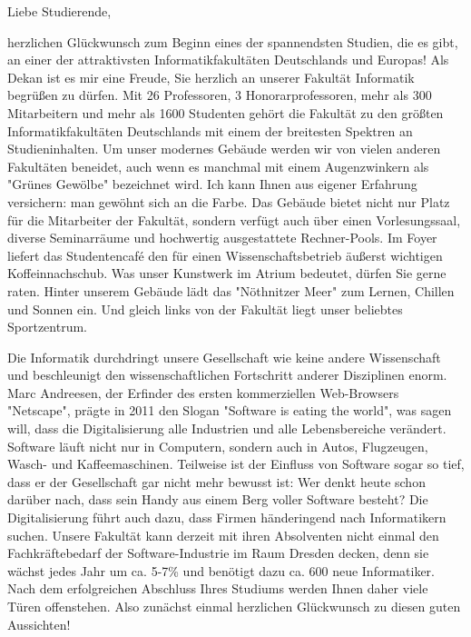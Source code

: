 {\fontsize{9.5pt}{11}\selectfont

Liebe Studierende,

herzlichen Glückwunsch zum Beginn eines der spannendsten Studien, die es gibt, an einer der attraktivsten Informatikfakultäten Deutschlands und Europas! Als Dekan ist es mir eine Freude, Sie herzlich an unserer Fakultät Informatik begrüßen zu dürfen. Mit 26 Professoren, 3 Honorarprofessoren, mehr als 300 Mitarbeitern und mehr als 1600 Studenten gehört die Fakultät zu den größten Informatikfakultäten Deutschlands mit einem der breitesten Spektren an Studieninhalten. Um unser modernes Gebäude werden wir von vielen anderen Fakultäten beneidet, auch wenn es manchmal mit einem Augenzwinkern als "Grünes Gewölbe" bezeichnet wird. Ich kann Ihnen aus eigener Erfahrung versichern: man gewöhnt sich an die Farbe. Das Gebäude bietet nicht nur Platz für die Mitarbeiter der Fakultät, sondern verfügt auch über einen Vorlesungssaal, diverse Seminarräume und hochwertig ausgestattete Rechner-Pools. Im Foyer liefert das Studentencafé \ascii{} den für einen Wissenschaftsbetrieb äußerst wichtigen Koffeinnachschub. Was unser Kunstwerk im Atrium bedeutet, dürfen Sie gerne raten. Hinter unserem Gebäude lädt das "Nöthnitzer Meer" zum Lernen, Chillen und Sonnen ein. Und gleich links von der Fakultät liegt unser beliebtes Sportzentrum.

Die Informatik durchdringt unsere Gesellschaft wie keine andere Wissenschaft und beschleunigt den wissenschaftlichen Fortschritt anderer Disziplinen enorm. Marc Andreesen, der Erfinder des ersten kommerziellen Web-Browsers "Netscape", prägte in 2011 den Slogan "Software is eating the world", was sagen will, dass die Digitalisierung alle Industrien und alle Lebensbereiche verändert. Software läuft nicht nur in Computern, sondern auch in Autos, Flugzeugen, Wasch- und Kaffeemaschinen. Teilweise ist der Einfluss von Software sogar so tief, dass er der Gesellschaft gar nicht mehr bewusst ist: Wer denkt heute schon darüber nach, dass sein Handy aus einem Berg voller Software besteht? Die Digitalisierung führt auch dazu, dass Firmen händeringend nach Informatikern suchen. Unsere Fakultät kann derzeit mit ihren Absolventen nicht einmal den Fachkräftebedarf der Software-Industrie im Raum Dresden decken, denn sie wächst jedes Jahr um ca. 5-7\% und benötigt dazu ca. 600 neue Informatiker. Nach dem erfolgreichen Abschluss Ihres Studiums werden Ihnen daher viele Türen offenstehen. Also zunächst einmal herzlichen Glückwunsch zu diesen guten Aussichten!

}
